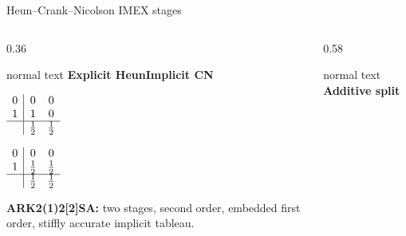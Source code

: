 \documentclass[aspectratio=169,10pt]{beamer}
\begin{document}
\begin{frame}[t]{Heun--Crank--Nicolson IMEX stages}
  \hypertarget{supp:numerics-imex-stages}{}
  \vspace{-0.18cm}\hfill
  \hspace{0.10cm}\GVBackupIndexButton
  \vspace{0.02cm}
  \begin{columns}[T,totalwidth=0.96\textwidth]
    \begin{column}{0.36\textwidth}
      \begin{beamercolorbox}[wd=\linewidth,sep=0.50em]{normal text}
        \small\textbf{\color{GVSourceBlue}Explicit Heun}\hfill\textbf{\color{GVDiffusionGreen}Implicit CN}\par
        \vspace{0.10cm}
        \centering\scriptsize
        \begin{minipage}[t]{0.42\linewidth}
          \centering
          \(\begin{array}{c|cc}
            0 & 0 & 0\\
            1 & 1 & 0\\ \hline
              & \tfrac12 & \tfrac12
          \end{array}\)
        \end{minipage}\hfill
        \begin{minipage}[t]{0.42\linewidth}
          \centering
          \(\begin{array}{c|cc}
            0 & 0 & 0\\
            1 & \tfrac12 & \tfrac12\\ \hline
              & \tfrac12 & \tfrac12
          \end{array}\)
        \end{minipage}\par
        \vspace{0.13cm}
        \scriptsize\color{GVSlate}
        \textbf{ARK2(1)2[2]SA:} two stages, second order, embedded first order, stiffly accurate implicit tableau.
      \end{beamercolorbox}
    \end{column}
    \begin{column}{0.58\textwidth}
      \begin{beamercolorbox}[wd=\linewidth,sep=0.50em]{normal text}
        \small\textbf{\color{GVTeal}Additive split}\par

\end{beamercolorbox}
\end{column}
\end{columns}
\end{frame}
\end{document}
